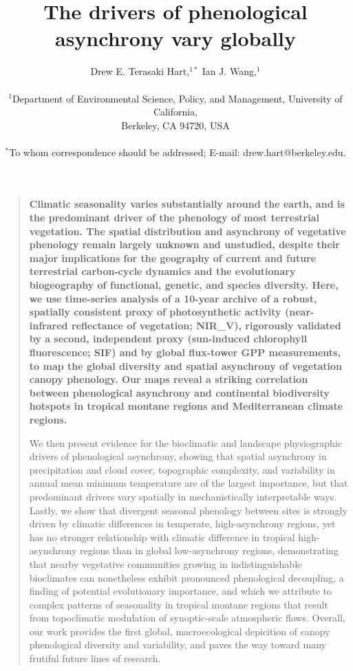 \documentclass[12pt]{article}
\title{The drivers of phenological asynchrony vary globally}
\author
{Drew E. Terasaki Hart,$^{1\ast}$ Ian J. Wang,$^{1}$\\
\\
\normalsize{$^{1}$Department of Environmental Science, Policy, and Management, University of California,}\\
\normalsize{Berkeley, CA 94720, USA}\\
\\
\normalsize{$^\ast$To whom correspondence should be addressed; E-mail:  drew.hart@berkeley.edu.}
}
\date{}
\newenvironment{sciabstract}{%
\begin{quote} \bf}
{\end{quote}}
\begin{document}
 


\baselineskip24pt


\maketitle 



\begin{sciabstract}
    Climatic seasonality varies substantially around the earth,
    and is the predominant driver of the phenology of most terrestrial vegetation.
    The spatial distribution and asynchrony of vegetative phenology
    remain largely unknown and unstudied, despite their
    major implications for the geography of current
    and future terrestrial carbon-cycle dynamics and the evolutionary biogeography of
    functional, genetic, and species diversity.
    Here, we use time-series analysis of a 10-year archive of a robust, spatially consistent proxy
    of photosynthetic activity (near-infrared reflectance of vegetation; NIR_{V}),
    rigorously validated by a second, independent proxy
    (sun-induced chlorophyll fluorescence; SIF) and by global flux-tower GPP measurements, 
    to map the global diversity and spatial asynchrony of vegetation canopy phenology.
    Our maps reveal a striking correlation between phenological asynchrony
    and continental biodiversity hotspots in tropical montane regions and Mediterranean climate regions.
    
    We then present evidence for the bioclimatic and landscape physiographic
    drivers of phenological asynchrony,
    showing that spatial asynchrony in precipitation and cloud cover,
    topographic complexity, and variability in annual mean minimum temperature 
    are of the largest importance, but that predominant
    drivers vary spatially in mechanistically interpretable ways.
    Lastly, we show that divergent seasonal phenology between sites is strongly driven
    by climatic differences in temperate, high-asynchrony regions,
    yet has no stronger relationship with climatic difference in tropical high-asynchrony
    regions than in global low-asynchrony regions,
    demonstrating that nearby vegetative communities growing in indistinguishable bioclimates
    can nonetheless exhibit pronounced phenological decoupling, a finding 
    of potential evolutionary importance, and which
    we attribute to complex patterns of seasonality in tropical montane
    regions that result from topoclimatic modulation of synoptic-scale atmospheric flows.
    Overall, our work provides the first global, macroecological depicition
    of canopy phenological diversity and variability,
    and paves the way toward many frutiful future lines of research.
\end{sciabstract}
\end{document}
